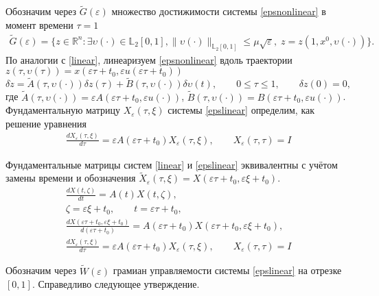 \documentclass[../main.tex]{subfiles}
\begin{document}
    Обозначим через $\widetilde{G}(\varepsilon)$ множество достижимости системы \eqref{epsnonlinear} в момент времени $\tau=1$
    \begin{gather*}
    	\widetilde{G}(\varepsilon)=\{z\in \mathbb{R}^n:\exists \upsilon(\cdot)\in \mathbb{L}_2[0,1],  \lVert \upsilon(\cdot)\rVert_{\mathbb{L}_2[0,1]}
    	\leqslant  \mu \sqrt{\varepsilon}, \; z=z(1,x^0,\upsilon(\cdot))\}.
    \end{gather*}
    По аналогии с \eqref{linear}, линеаризуем \eqref{epsnonlinear} вдоль траектории $ z(\tau,\upsilon(\tau)) = x(\varepsilon \tau + t_0,\varepsilon u(\varepsilon \tau + t_0)) $
    \begin{equation}\label{epslinear}
    	\delta\dot{z} = \widetilde{A}(\tau, \upsilon(\cdot)) \delta z(\tau) +\widetilde{B}(\tau, \upsilon(\cdot)) \delta \upsilon(t),\qquad 0 \leqslant \tau \leqslant 1,  \qquad \delta z(0) = 0,
    \end{equation}
	где $ \widetilde{A}(\tau, \upsilon(\cdot)) = \varepsilon A(\varepsilon \tau + t_0, \varepsilon u (\cdot)) $,  $\widetilde{B}(\tau, \upsilon(\cdot)) = B(\varepsilon \tau + t_0, \varepsilon u (\cdot)) $. 
	Фундаментальную матрицу $ X_{\varepsilon}(\tau,\xi) $ системы \eqref{epslinear} определим, как решение уравнения
\begin{gather*}
	\frac{dX_{\varepsilon}(\tau,\xi)}{d\tau} = \varepsilon A(\varepsilon \tau + t_0) X_{\varepsilon}(\tau,\xi), \qquad X_{\varepsilon}(\tau,\tau) = I
\end{gather*}

Фундаментальные матрицы систем \eqref{linear} и \eqref{epslinear} эквивалентны с учётом замены времени и обозначения $ \widetilde{X}_{\varepsilon}(\tau,\xi) = X(\varepsilon \tau + t_0,\varepsilon \xi + t_0) $.
\begin{gather*}
	\frac{dX(t,\zeta)}{dt} = A(t) X(t,\zeta), \\
	\zeta = \varepsilon \xi + t_0, \qquad t = \varepsilon \tau + t_0, \\
	\frac{dX(\varepsilon \tau + t_0,\varepsilon \xi + t_0)}{d(\varepsilon \tau + t_0)} = A(\varepsilon \tau + t_0) X(\varepsilon \tau + t_0,\varepsilon \xi + t_0), \\
	\frac{dX_{ \varepsilon}(\tau,\xi)}{d\tau} = \varepsilon A(\varepsilon \tau + t_0) X_{ \varepsilon}(\tau,\xi), \qquad X_{\varepsilon}(\tau,\tau) = I
\end{gather*}

Обозначим через $ \widetilde{W}(\varepsilon) $ грамиан управляемости системы \eqref{epslinear} на отрезке $ [0,1] $. Справедливо следующее утверждение.
\end{document}
